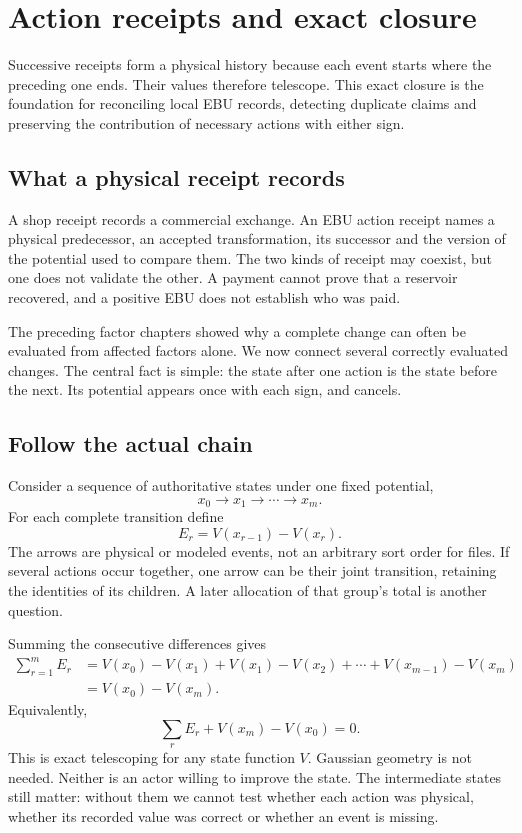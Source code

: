 \chapter{Action receipts and exact closure}\label{ch:receipts}

Successive receipts form a physical history because each event starts where the preceding one ends. Their values therefore telescope. This exact closure is the foundation for reconciling local EBU records, detecting duplicate claims and preserving the contribution of necessary actions with either sign.


\section{What a physical receipt records}
A shop receipt records a commercial exchange. An EBU action receipt names a
physical predecessor, an accepted transformation, its successor and the
version of the potential used to compare them. The two kinds of receipt may
coexist, but one does not validate the other. A payment cannot prove that a
reservoir recovered, and a positive EBU does not establish who was paid.

The preceding factor chapters showed why a complete change can often be evaluated
from affected factors alone. We now connect several correctly evaluated
changes. The central fact is simple: the state after one action is the state
before the next. Its potential appears once with each sign, and cancels.

\section{Follow the actual chain}
Consider a sequence of authoritative states under one fixed potential,
\begin{equation}
 x_0\longrightarrow x_1\longrightarrow\cdots\longrightarrow x_m.
\end{equation}
For each complete transition define
\begin{equation}
 E_r=V(x_{r-1})-V(x_r).
\end{equation}
The arrows are physical or modeled events, not an arbitrary sort order for
files. If several actions occur together, one arrow can be their joint
transition, retaining the identities of its children. A later allocation of
that group's total is another question.

Summing the consecutive differences gives
\begin{align}
 \sum_{r=1}^m E_r
 &=V(x_0)-V(x_1)+V(x_1)-V(x_2)+\cdots
   +V(x_{m-1})-V(x_m)\\
 &=V(x_0)-V(x_m).
\end{align}
Equivalently,
\begin{equation}\label{eq:receipt-closure}
 \sum_r E_r+V(x_m)-V(x_0)=0.
\end{equation}
This is exact telescoping for any state function $V$. Gaussian geometry is
not needed. Neither is an actor willing to improve the state. The
intermediate states still matter: without them we cannot test whether each
action was physical, whether its recorded value was correct or whether an
event is missing.

